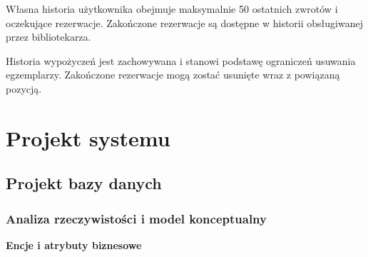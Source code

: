 \documentclass[11pt, a4paper]{article}
\begin{document}
Własna historia użytkownika obejmuje maksymalnie 50 ostatnich zwrotów i oczekujące rezerwacje. Zakończone rezerwacje są dostępne w historii obsługiwanej przez bibliotekarza.

Historia wypożyczeń jest zachowywana i stanowi podstawę ograniczeń usuwania egzemplarzy. Zakończone rezerwacje mogą zostać usunięte wraz z powiązaną pozycją.

\section{Projekt systemu}

\subsection{Projekt bazy danych}
\subsubsection{Analiza rzeczywistości i model konceptualny}
\label{subsec:model-konceptualny}

\noindent\textbf{Encje i atrybuty biznesowe}
\end{document}
